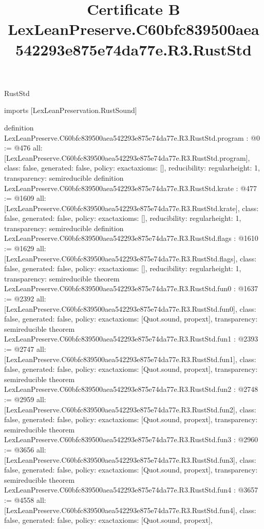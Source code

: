 \begin{lexlean}{RustStd}
\title{Certificate B LexLeanPreserve.C60bfc839500aea542293e875e74da77e.R3.RustStd}
\begin{coremodule}
imports [LexLeanPreservation.RustSound]

definition LexLeanPreserve.C60bfc839500aea542293e875e74da77e.R3.RustStd.program : @0 := @476 {
  all: [LexLeanPreserve.C60bfc839500aea542293e875e74da77e.R3.RustStd.program],
  class: false,
  generated: false,
  policy: exact{axioms: []},
  reducibility: regular{height: 1},
  transparency: semireducible
}
definition LexLeanPreserve.C60bfc839500aea542293e875e74da77e.R3.RustStd.krate : @477 := @1609 {
  all: [LexLeanPreserve.C60bfc839500aea542293e875e74da77e.R3.RustStd.krate],
  class: false,
  generated: false,
  policy: exact{axioms: []},
  reducibility: regular{height: 1},
  transparency: semireducible
}
definition LexLeanPreserve.C60bfc839500aea542293e875e74da77e.R3.RustStd.flags : @1610 := @1629 {
  all: [LexLeanPreserve.C60bfc839500aea542293e875e74da77e.R3.RustStd.flags],
  class: false,
  generated: false,
  policy: exact{axioms: []},
  reducibility: regular{height: 1},
  transparency: semireducible
}
theorem LexLeanPreserve.C60bfc839500aea542293e875e74da77e.R3.RustStd.fun0 : @1637 := @2392 {
  all: [LexLeanPreserve.C60bfc839500aea542293e875e74da77e.R3.RustStd.fun0],
  class: false,
  generated: false,
  policy: exact{axioms: [Quot.sound, propext]},
  transparency: semireducible
}
theorem LexLeanPreserve.C60bfc839500aea542293e875e74da77e.R3.RustStd.fun1 : @2393 := @2747 {
  all: [LexLeanPreserve.C60bfc839500aea542293e875e74da77e.R3.RustStd.fun1],
  class: false,
  generated: false,
  policy: exact{axioms: [Quot.sound, propext]},
  transparency: semireducible
}
theorem LexLeanPreserve.C60bfc839500aea542293e875e74da77e.R3.RustStd.fun2 : @2748 := @2959 {
  all: [LexLeanPreserve.C60bfc839500aea542293e875e74da77e.R3.RustStd.fun2],
  class: false,
  generated: false,
  policy: exact{axioms: [Quot.sound, propext]},
  transparency: semireducible
}
theorem LexLeanPreserve.C60bfc839500aea542293e875e74da77e.R3.RustStd.fun3 : @2960 := @3656 {
  all: [LexLeanPreserve.C60bfc839500aea542293e875e74da77e.R3.RustStd.fun3],
  class: false,
  generated: false,
  policy: exact{axioms: [Quot.sound, propext]},
  transparency: semireducible
}
theorem LexLeanPreserve.C60bfc839500aea542293e875e74da77e.R3.RustStd.fun4 : @3657 := @4558 {
  all: [LexLeanPreserve.C60bfc839500aea542293e875e74da77e.R3.RustStd.fun4],
  class: false,
  generated: false,
  policy: exact{axioms: [Quot.sound, propext]},
}
\end{coremodule}
\end{lexlean}
